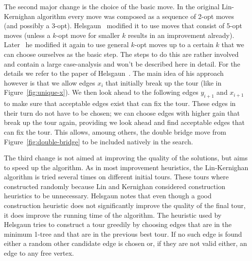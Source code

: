 \documentclass[12pt]{article}
\begin{document}
    The second major change is the choice of the basic move. In the original Lin-Kernighan algorithm
    every move was composed as a sequence of 2-opt moves (and possibly a 3-opt).
    Helsgaun~\cite{lkh1} modified it to use moves that consist of 5-opt moves (unless a $k$-opt move
    for smaller $k$ results in an improvement already). Later~\cite{lkh2} he modified it again to
    use general $k$-opt moves up to a certain $k$ that we can choose ourselves as the basic step.
    The steps to do this are rather involved and contain a large case-analysis and won't be
    described here in detail. For the details we refer to the paper of Helsgaun~\cite{lkh2}.
    The main idea of his approach however is that we allow edges $x_i$ that initially break up the
    tour (like in Figure~\ref{fig:unique-x}). We then look ahead to the following edges $y_{i+1}$
    and $x_{i+1}$ to make sure that acceptable edges exist that can fix the tour. These edges in
    their turn do not have to be chosen; we can choose edges with higher gain that break up the tour
    again, providing we look ahead and find acceptable edges that can fix the tour. This allows,
    amoung others, the double bridge move from Figure~\ref{fig:double-bridge} to be included
    natively in the search.


    The third change is not aimed at improving the quality of the solutions, but aims to speed up
    the algorithm.
    As in most improvement heuristics, the Lin-Kernighan algorithm is tried several times on
    different initial tours. These tours where constructed randomly because Lin and Kernighan
    considered construction heuristics to be unnecessary. Helsgaun notes that even though a good
    construction heuristic does not significantly improve the quality of the final tour, it does
    improve the running time of the algorithm.
    The heuristic used by Helsgaun tries to construct a tour greedily by choosing edges that are in
    the minimum 1-tree and that are in the previous best tour. If no such edge is found either a
    random other candidate edge is chosen or, if they are not valid either, an edge to any free
    vertex.
\end{document}
